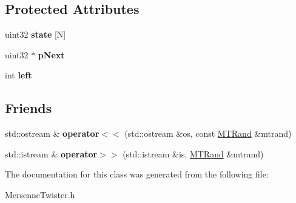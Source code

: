 \subsection*{Protected Attributes}
\begin{DoxyCompactItemize}
\item 
\hypertarget{classMTRand_a2c87f537429bf0b0f6a452c22b9eebba}{}uint32 {\bfseries state} \mbox{[}N\mbox{]}\label{classMTRand_a2c87f537429bf0b0f6a452c22b9eebba}

\item 
\hypertarget{classMTRand_a2b80858137c88fe69d4d2bdc665bcf93}{}uint32 $\ast$ {\bfseries p\+Next}\label{classMTRand_a2b80858137c88fe69d4d2bdc665bcf93}

\item 
\hypertarget{classMTRand_a98eabf568c88f121e44f487397f32495}{}int {\bfseries left}\label{classMTRand_a98eabf568c88f121e44f487397f32495}

\end{DoxyCompactItemize}
\subsection*{Friends}
\begin{DoxyCompactItemize}
\item 
\hypertarget{classMTRand_a059061d50a1e54ee3067d4e1dbdd7c64}{}std\+::ostream \& {\bfseries operator$<$$<$} (std\+::ostream \&os, const \hyperlink{classMTRand}{M\+T\+Rand} \&mtrand)\label{classMTRand_a059061d50a1e54ee3067d4e1dbdd7c64}

\item 
\hypertarget{classMTRand_a45b02a702835a3be42171c5c2dc79b2d}{}std\+::istream \& {\bfseries operator$>$$>$} (std\+::istream \&is, \hyperlink{classMTRand}{M\+T\+Rand} \&mtrand)\label{classMTRand_a45b02a702835a3be42171c5c2dc79b2d}

\end{DoxyCompactItemize}


The documentation for this class was generated from the following file\+:\begin{DoxyCompactItemize}
\item 
Mersenne\+Twister.\+h\end{DoxyCompactItemize}
